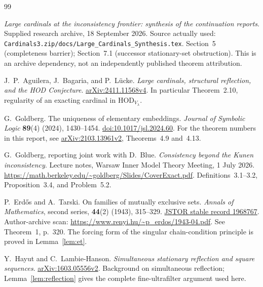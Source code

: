 \documentclass[11pt,letterpaper]{article}
\theoremstyle{definition}
\numberwithin{equation}{section}
\newcommand{\HOD}{\mathrm{HOD}}
\begin{document}
\clearpage
{}
{}
\begin{thebibliography}{99}
\small
\setlength{\itemsep}{7pt}

\emph{Large cardinals at the inconsistency frontier: synthesis of the continuation reports}. Supplied research archive, 18 September 2026. Source actually used:
\nolinkurl{Cardinals3.zip/docs/Large_Cardinals_Synthesis.tex}.
Section~5 (completeness barrier); Section~7.1 (successor stationary-set obstruction). This is an archive dependency, not an independently published theorem attribution.

J.~P.~Aguilera, J.~Bagaria, and P.~L\"ucke.
\emph{Large cardinals, structural reflection, and the HOD Conjecture}.
\href{https://arxiv.org/abs/2411.11568v4}{arXiv:2411.11568v4}.
In particular Theorem~2.10, regularity of an exacting cardinal in $\HOD_{V_\lambda}$.

G.~Goldberg. The uniqueness of elementary embeddings.
\emph{Journal of Symbolic Logic} \textbf{89}(4) (2024), 1430--1454.
\href{https://doi.org/10.1017/jsl.2024.60}{doi:10.1017/jsl.2024.60}.
For the theorem numbers in this report, see
\href{https://arxiv.org/abs/2103.13961v2}{arXiv:2103.13961v2}, Theorems~4.9 and~4.13.

G.~Goldberg, reporting joint work with D.~Blue.
\emph{Consistency beyond the Kunen inconsistency}.
Lecture notes, Warsaw Inner Model Theory Meeting, 1 July 2026.
\url{https://math.berkeley.edu/~goldberg/Slides/CoverExact.pdf}.
Definitions~3.1--3.2, Proposition~3.4, and Problem~5.2.

P.~Erd\H{o}s and A.~Tarski. On families of mutually exclusive sets.
\emph{Annals of Mathematics}, second series, \textbf{44}(2) (1943), 315--329.
\href{https://www.jstor.org/stable/1968767}{JSTOR stable record 1968767}.
Author-archive scan:
\url{https://www.renyi.hu/~p_erdos/1943-04.pdf}.
See Theorem~1, p.~320. The forcing form of the singular chain-condition principle is proved in Lemma~\ref{lem:et}.

Y.~Hayut and C.~Lambie-Hanson.
\emph{Simultaneous stationary reflection and square sequences}.
\href{https://arxiv.org/abs/1603.05556v2}{arXiv:1603.05556v2}.
Background on simultaneous reflection; Lemma~\ref{lem:reflection} gives the complete fine-ultrafilter argument used here.

\end{thebibliography}
\end{document}
